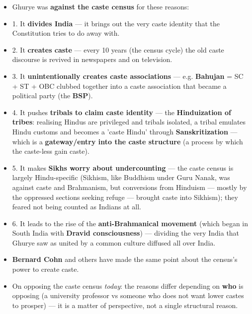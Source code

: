 \begin{CriticalPoint}
\begin{itemize}
\item Ghurye was \textbf{against the caste census} for these reasons:
\item 1. It \textbf{divides India} --- it brings out the very caste identity that the Constitution tries to do away with.
\item 2. It \textbf{creates caste} --- every 10 years (the census cycle) the old caste discourse is revived in newspapers and on television.
\item 3. It \textbf{unintentionally creates caste associations} --- e.g. \textbf{Bahujan} = SC + ST + OBC clubbed together into a caste association that became a political party (the \textbf{BSP}).
\item 4. It pushes \textbf{tribals to claim caste identity} --- the \textbf{Hinduization of tribes}: realising Hindus are privileged and tribals isolated, a tribal emulates Hindu customs and becomes a 'caste Hindu' through \textbf{Sanskritization} --- which is a \textbf{gateway/entry into the caste structure} (a process by which the caste-less gain caste).
\item 5. It makes \textbf{Sikhs worry about undercounting} --- the caste census is largely Hindu-specific (Sikhism, like Buddhism under Guru Nanak, was against caste and Brahmanism, but conversions from Hinduism --- mostly by the oppressed sections seeking refuge --- brought caste into Sikhism); they feared not being counted as Indians at all.
\item 6. It leads to the rise of the \textbf{anti-Brahmanical movement} (which began in South India with \textbf{Dravid consciousness}) --- dividing the very India that Ghurye saw as united by a common culture diffused all over India.
\end{itemize}
\end{CriticalPoint}

\begin{KeyConcept}
\begin{itemize}
\item \textbf{Bernard Cohn} and others have made the same point about the census's power to create caste.
\item On opposing the caste census \emph{today}: the reasons differ depending on \textbf{who} is opposing (a university professor vs someone who does not want lower castes to prosper) --- it is a matter of perspective, not a single structural reason.
\end{itemize}
\end{KeyConcept}


